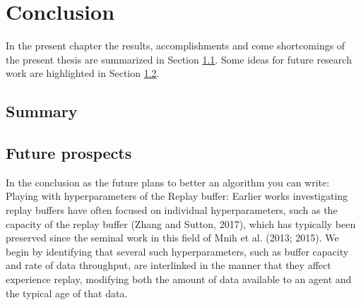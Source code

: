 \clearpage

\section{Conclusion}\label{chap:chap_5}

In the present chapter the results, accomplishments and come shortcomings of the present thesis are summarized in Section \ref{sec:subsec_5.1}. Some ideas for future research work are highlighted in Section \ref{sec:subsec_5.2}.


\subsection{Summary}\label{sec:subsec_5.1}


\subsection{Future prospects}\label{sec:subsec_5.2}

In the conclusion as the future plans to better an algorithm you can write:
Playing with hyperparameters of the Replay buffer:
Earlier works investigating replay buffers have often focused on individual hyperparameters, such as the capacity of the replay buffer (Zhang and Sutton, 2017), which has typically been preserved since the seminal work in this field of Mnih et al. (2013; 2015). We begin by identifying that several such hyperparameters, such as buffer capacity and rate of data throughput, are interlinked in the manner that they affect experience replay, modifying both the amount of data available to an agent and the typical age of that data.